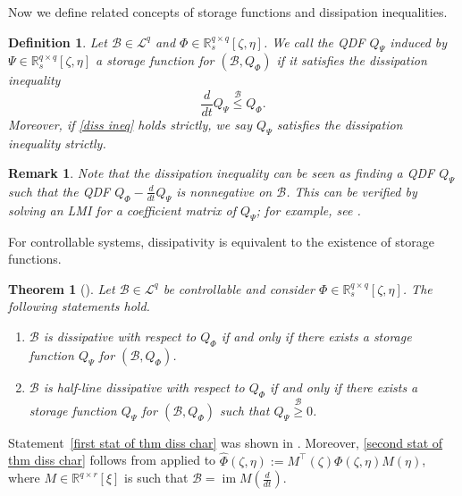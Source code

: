\documentclass[letterpaper, 10 pt, conference]{ieeeconf}
\theoremstyle{ieeeconf}
\newtheorem{theorem}{Theorem}
\newtheorem{remark}{Remark}
\newtheorem{definition}{Definition}
\DeclareMathOperator{\im}{im}
\newcommand{\R}{\mathbb{R}}
\newcommand{\B}{\mathcal{B}}
\begin{document}
Now we define related concepts of storage functions and dissipation inequalities.
\begin{definition}
	Let $\B \in \mathcal{L}^q$ and $\Phi \in \R_s^{q \times q}[\zeta,\eta]$. We call the QDF $Q_\Psi$ induced by $\Psi \in \R_s^{q \times q}[\zeta,\eta]$ a \emph{storage function for $(\B, Q_\Phi)$} if it satisfies the \emph{dissipation inequality}
	\vspace{-0.5ex}
	\begin{equation}
		\frac{d}{dt}Q_\Psi \stackrel{\mathcal{B}}{\leq} Q_\Phi.
		\label{diss ineq}
	\end{equation}
	Moreover, if \eqref{diss ineq} holds strictly, we say $Q_{\Psi}$ satisfies the dissipation inequality strictly.
\end{definition}
\begin{remark}
Note that the dissipation inequality can be seen as finding a QDF $Q_\Psi$ such that the QDF $Q_\Phi -\frac{d}{dt}Q_\Psi$ is nonnegative on $\B$. This can be verified by solving an LMI for a coefficient matrix of $Q_\Psi$; for example, see \cite[Algorithm~8]{belur_algorithmic_2002}. %
\end{remark}

For controllable systems, dissipativity is equivalent to the existence of storage functions. 
\begin{theorem}[]
	Let $\B \in \mathcal{L}^q$ be controllable and consider ${\Phi\in \R_s^{q \times q}[\zeta, \eta]}$. 
	The following statements hold.
	\begin{enumerate}[label=\roman*)]
		\item $\B$ is dissipative with respect to $Q_\Phi$ if and only if there exists a storage function $Q_\Psi$ for $(\B, Q_\Phi)$. \label{first stat of thm diss char}
		\item  $\B$ is half-line dissipative with respect to $Q_\Phi$ if and only if there exists a storage function $Q_\Psi$ for $(\B, Q_\Phi)$ such that $Q_\Psi \stackrel{\mathcal{B}}{\geq }0$. \label{second stat of thm diss char}
	\end{enumerate}
	\label{t: diss char}
\end{theorem}
Statement~\ref{first stat of thm diss char} was shown in \cite[Theorem~4.3]{trentelman_every_1997}. Moreover, \ref{second stat of thm diss char} follows from \cite[Theorem~6.3]{willems_quadratic_1998} applied to ${\hat{\Phi}(\zeta,\eta):= M^\top (\zeta)\Phi(\zeta,\eta)M(\eta)}$, where $M \in \R^{q \times r}[\xi]$ is such that $\B=\im M\left(\frac{d}{dt}\right)$.
\end{document}
